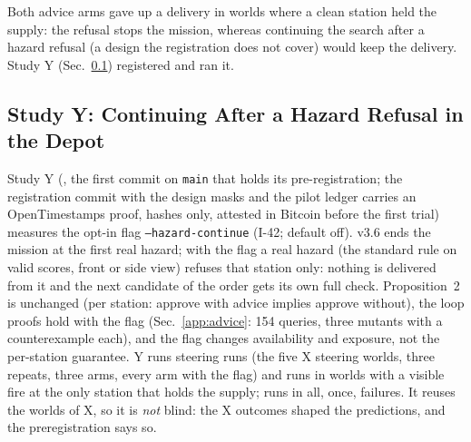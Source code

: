 \documentclass[conference]{IEEEtran}
\begin{document}
{Both advice arms gave up a delivery in worlds where a clean station held the supply: the refusal stops the mission, whereas continuing the search after a hazard refusal (a design the registration does not cover) would keep the delivery. Study Y (Sec.~\ref{sec:moved-y}) registered and ran it.}

\subsection{Study Y: Continuing After a Hazard Refusal in the Depot}\label{sec:moved-y}
Study Y (\RegY, the first commit on \texttt{main} that holds its pre-registration; the registration commit with the design masks and the pilot ledger carries an OpenTimestamps proof, hashes only, attested in Bitcoin before the first trial) measures the opt-in flag \texttt{--hazard-continue} (I-42; default off). v3.6 ends the mission at the first real hazard; with the flag a real hazard (the standard rule on valid scores, front or side view) refuses that station only: nothing is delivered from it and the next candidate of the order gets its own full check. Proposition~2 is unchanged (per station: approve with advice implies approve without), the loop proofs hold with the flag (Sec.~\ref{app:advice}: 154 queries, three mutants with a counterexample each), and the flag changes availability and exposure, not the per-station guarantee. Y runs \YNs{} steering runs (the five X steering worlds, three repeats, three arms, every arm with the flag) and \YNc{} runs in worlds with a visible fire at the only station that holds the supply; \YN{} runs in all, once, \YFailed{} failures. It reuses the worlds of X, so it is \emph{not} blind: the X outcomes shaped the predictions, and the preregistration says so.
\end{document}
